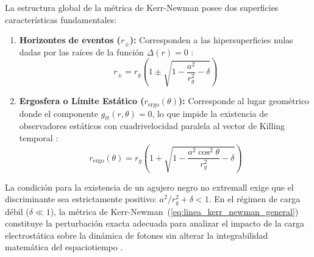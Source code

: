 La estructura global de la métrica de Kerr-Newman posee dos superficies características fundamentales:
\begin{enumerate}
    \item \textbf{Horizontes de eventos ($r_\pm$):} Corresponden a las hipersuperficies nulas dadas por las raíces de la función $\Delta(r) = 0$ \citep{1403.5234v2, s10052-021-09180-y}:
    \begin{equation}
        r_\pm = r_g \left( 1 \pm \sqrt{1 - \frac{a^2}{r_g^2} - \delta} \right)
        \label{eq:horizontes_KN}
    \end{equation}
    \item \textbf{Ergosfera o Límite Estático ($r_{\text{ergo}}(\theta)$):} Corresponde al lugar geométrico donde el componente $g_{tt}(r,\theta) = 0$, lo que impide la existencia de observadores estáticos con cuadrivelocidad paralela al vector de Killing temporal \citep{M_P_Hobson_General_Relativity, Sean_Carroll_Spacetime}:
    \begin{equation}
        r_{\text{ergo}}(\theta) = r_g \left( 1 + \sqrt{1 - \frac{a^2 \cos^2\theta}{r_g^2} - \delta} \right)
        \label{eq:ergosfera_KN}
    \end{equation}
\end{enumerate}
La condición para la existencia de un agujero negro no extremall exige que el discriminante sea estrictamente positivo: $a^2/r_g^2 + \delta < 1$. En el régimen de carga débil ($\delta \ll 1$), la métrica de Kerr-Newman~(\ref{eq:linea_kerr_newman_general}) constituye la perturbación exacta adecuada para analizar el impacto de la carga electrostática sobre la dinámica de fotones sin alterar la integrabilidad matemática del espaciotiempo \citep{1403.5234v2, s10052-021-09180-y}.